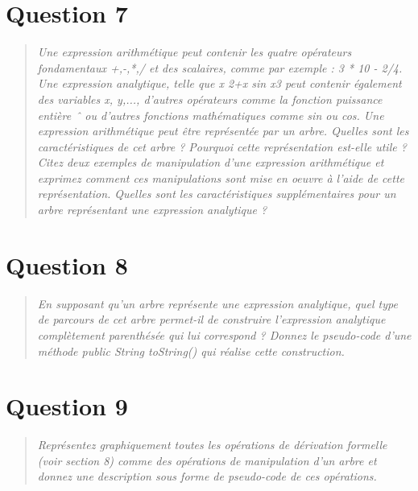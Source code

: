 \documentclass[11pt,a4paper]{article}
\begin{document}
\section{Question 7}
\begin{quotation}
\color{gray}\textit{Une expression arithmétique peut contenir les quatre opérateurs fondamentaux
+,-,*,/ et des scalaires, comme par exemple : 3 * 10 - 2/4. Une expression
analytique, telle que x
2+x sin x3 peut contenir également des variables x, y,...,
d’autres opérateurs comme la fonction puissance entière ˆ ou d’autres fonctions
mathématiques comme sin ou cos.
Une expression arithmétique peut être représentée par un arbre. Quelles sont les
caractéristiques de cet arbre ? Pourquoi cette représentation est-elle utile ? Citez
deux exemples de manipulation d’une expression arithmétique et exprimez comment ces manipulations sont mise en oeuvre à l’aide de cette représentation.
Quelles sont les caractéristiques supplémentaires pour un arbre représentant une
expression analytique ?}
\end{quotation}

\section{Question 8}
\begin{quotation}
\color{gray}\textit{En supposant qu’un arbre représente une expression analytique, quel type de parcours de cet arbre permet-il de construire l’expression analytique complètement
parenthésée qui lui correspond ? Donnez le pseudo-code d’une méthode public
String toString() qui réalise cette construction.}
\end{quotation}

\section{Question 9}
\begin{quotation}
\color{gray}\textit{Représentez graphiquement toutes les opérations de dérivation formelle (voir section 8) comme des opérations de manipulation d’un arbre et donnez une description sous forme de pseudo-code de ces opérations.}
\end{quotation}
\end{document}
